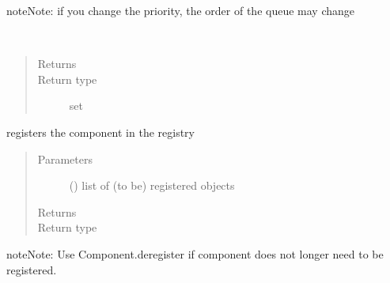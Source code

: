 \documentclass[letterpaper,10pt,english]{sphinxmanual}
\begin{document}
\begin{fulllineitems}
\begin{fulllineitems}
\begin{sphinxadmonition}{note}{Note:}
if you change the priority, the order of the queue may change
\end{sphinxadmonition}

\end{fulllineitems}


\begin{fulllineitems}
\label{\detokenize{Reference:salabim.Component.queues}}~\begin{quote}\begin{description}
\item[{Returns}] \leavevmode
{}

\item[{Return type}] \leavevmode
set

\end{description}\end{quote}

\end{fulllineitems}


\begin{fulllineitems}
\label{\detokenize{Reference:salabim.Component.register}}
registers the component in the registry
\begin{quote}\begin{description}
\item[{Parameters}] \leavevmode
{} () \textendash{} list of (to be) registered objects

\item[{Returns}] \leavevmode
{}

\item[{Return type}] \leavevmode
{\hyperref[\detokenize{Reference:salabim.Component}]{}}

\end{description}\end{quote}

\begin{sphinxadmonition}{note}{Note:}
Use Component.deregister if component does not longer need to be registered.
\end{sphinxadmonition}


\end{fulllineitems}
\end{fulllineitems}
\end{document}
